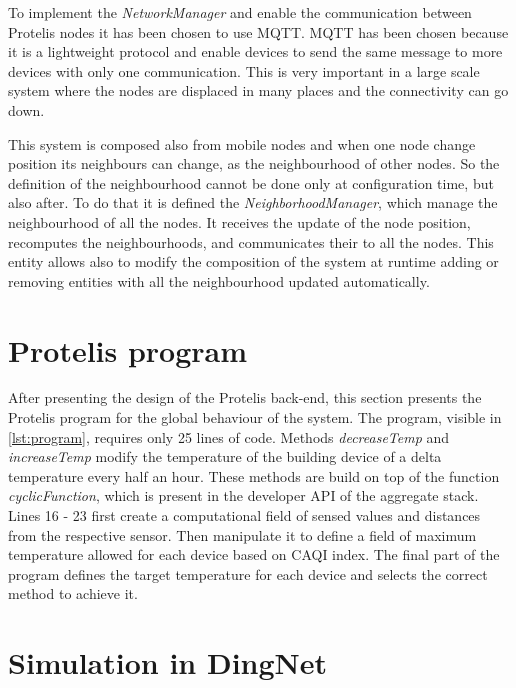 \noindent To implement the \mbox{\textit{NetworkManager}} and enable the communication between Protelis nodes it has been chosen to use MQTT.
MQTT has been chosen because it is a lightweight protocol and enable devices to send the same message to more devices with only one communication.
This is very important in a large scale system where the nodes are displaced in many places and the connectivity can go down.

\noindent This system is composed also from mobile nodes and when one node change position its neighbours can change, as the neighbourhood of other nodes. 
So the definition of the neighbourhood cannot be done only at configuration time, but also after.
To do that it is defined the \mbox{\textit{NeighborhoodManager}}, which manage the neighbourhood of all the nodes.
It receives the update of the node position, recomputes the neighbourhoods, and communicates their to all the nodes. 
This entity allows also to modify the composition of the system at runtime adding or removing entities with all the neighbourhood updated automatically.

\section{Protelis program}
After presenting the design of the Protelis back-end, this section presents the Protelis program for the global behaviour of the system. 
The program, visible in \autoref{lst:program}, requires only 25 lines of code.
Methods \mbox{\textit{decreaseTemp}} and \mbox{\textit{increaseTemp}} modify the temperature of the building device of a delta temperature every half an hour.
These methods are build on top of the function \mbox{\textit{cyclicFunction}}, which is present in the developer API of the aggregate stack.
Lines 16 - 23 first create a computational field of sensed values and distances from the respective sensor. Then manipulate it to define a field of maximum temperature allowed for each device based on CAQI index.
The final part of the program defines the target temperature for each device and selects the correct method to achieve it. 



\section{Simulation in DingNet}

